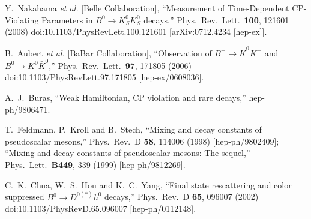 \documentclass[aps,preprint,floats,epsf,epsfig,nofootinbib,letter]{revtex4}
\begin{document}
\begin{thebibliography}{99}
  Y.~Nakahama {\it et al.} [Belle Collaboration],
  ``Measurement of Time-Dependent CP-Violating Parameters in $B^0 \to K^0_S K^0_S$ decays,''
  Phys.\ Rev.\ Lett.\  {\bf 100}, 121601 (2008)
  doi:10.1103/PhysRevLett.100.121601
  [arXiv:0712.4234 [hep-ex]].

  B.~Aubert {\it et al.} [BaBar Collaboration],
  ``Observation of $B^{+} \to \bar{K}^0 K^{+}$ and $B^0 \to K^0 \bar{K}^0$,''
  Phys.\ Rev.\ Lett.\  {\bf 97}, 171805 (2006)
  doi:10.1103/PhysRevLett.97.171805
  [hep-ex/0608036].



  A.~J.~Buras,
  ``Weak Hamiltonian, CP violation and rare decays,''
  hep-ph/9806471.


T.~Feldmann, P.~Kroll and B.~Stech,
``Mixing and decay constants of pseudoscalar mesons,''
Phys.~Rev.~D {\bf 58}, 114006 (1998) [hep-ph/9802409];
``Mixing and decay constants of pseudoscalar mesons: The sequel,''
Phys.\ Lett.\ {\bf B449}, 339 (1999) [hep-ph/9812269].


  C.~K.~Chua, W.~S.~Hou and K.~C.~Yang,
  ``Final state rescattering and color suppressed $\overline B{}^0 \to D^{0(*)} h^0$ decays,''
  Phys.\ Rev.\ D {\bf 65}, 096007 (2002)
  doi:10.1103/PhysRevD.65.096007
  [hep-ph/0112148].


\end{thebibliography}
\end{document}
